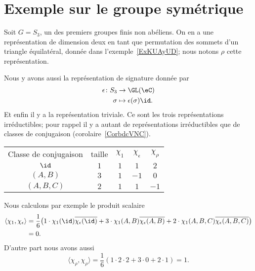 \section{Exemple sur le groupe symétrique}

Soit \( G=S_3\), un des premiers groupes finis non abéliens. On en a une représentation de dimension deux en tant que permutation des sommets d'un triangle équilatéral, donnée dans l'exemple~\ref{ExKUAyUD}; nous notons \( \rho\) cette représentation.

Nous y avons aussi la représentation de signature donnée par
\begin{equation}
	\begin{aligned}
		\epsilon\colon S_3 & \to \GL(\eC)                 \\
		\sigma             & \mapsto \epsilon(\sigma)\id.
	\end{aligned}
\end{equation}
Et enfin il y a la représentation triviale. Ce sont les trois représentations irréductibles; pour rappel il y a autant de représentations irréductibles que de classes de conjugaison (corolaire~\ref{CorbdcVNC}).

\begin{center}
	\begin{tabular}[]{ccccc}
		Classe de conjugaison & taille & \( \chi_1\) & \( \chi_{\epsilon}\) & \( \chi_{\rho}\) \\
		\( \id\)              & \( 1\) & \( 1\)      & \( 1\)               & \( 2\)           \\
		\( (A,B)\)            & \( 3\) & \( 1\)      & \( -1\)              & \( 0\)           \\
		\( (A,B,C)\)          & \( 2\) & \( 1\)      & \( 1\)               & \( -1\)          \\
	\end{tabular}
\end{center}

Nous calculons par exemple le produit scalaire
\begin{subequations}
	\begin{align}
		\langle \chi_1, \chi_{\epsilon}\rangle & =\frac{1}{ 6 }\big( 1\cdot\chi_1(\id)\overline{ \chi_{\epsilon}(\id) }+3\cdot \chi_1(A,B)\overline{ \chi_{\epsilon}(A,B) }+2\cdot \chi_1(A,B,C)\overline{ \chi_{\epsilon}(A,B,C) } \big) \\
		                                       & =0.
	\end{align}
\end{subequations}
D'autre part nous avons aussi
\begin{equation}
	\langle \chi_{\rho}, \chi_{\rho}\rangle =\frac{1}{ 6 }(1\cdot2\cdot 2+3\cdot 0+2\cdot 1)=1.
\end{equation}

